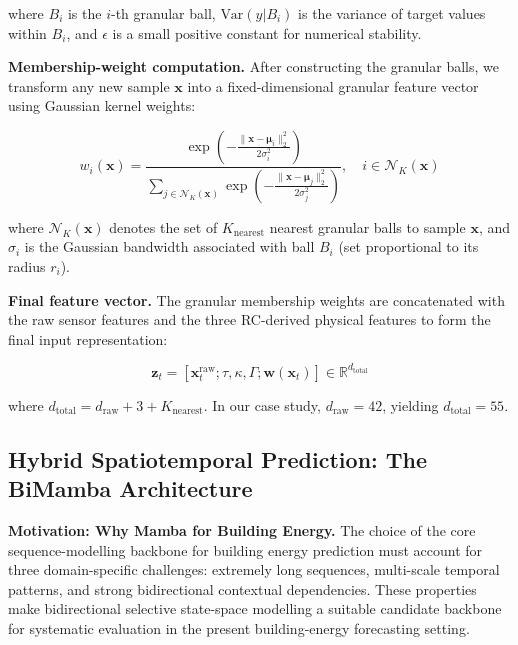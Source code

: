 \documentclass[11pt]{article}
\begin{document}
where $B_i$ is the $i$-th granular ball, $\text{Var}(y|B_i)$ is the variance of target values within $B_i$, and $\epsilon$ is a small positive constant for numerical stability.

\textbf{Membership-weight computation.} After constructing the granular balls, we transform any new sample $\mathbf{x}$ into a fixed-dimensional granular feature vector using Gaussian kernel weights:

\begin{equation}
w_i(\mathbf{x}) = \frac{\exp\left( -\frac{\|\mathbf{x} - \boldsymbol{\mu}_i\|_2^2}{2\sigma_i^2} \right)}{\sum_{j \in \mathcal{N}_K(\mathbf{x})} \exp\left( -\frac{\|\mathbf{x} - \boldsymbol{\mu}_j\|_2^2}{2\sigma_j^2} \right)}, \quad i \in \mathcal{N}_K(\mathbf{x})
\end{equation}

where $\mathcal{N}_K(\mathbf{x})$ denotes the set of $K_{\text{nearest}}$ nearest granular balls to sample $\mathbf{x}$, and $\sigma_i$ is the Gaussian bandwidth associated with ball $B_i$ (set proportional to its radius $r_i$).

\textbf{Final feature vector.} The granular membership weights are concatenated with the raw sensor features and the three RC-derived physical features to form the final input representation:

\begin{equation}
\mathbf{z}_t = [\mathbf{x}_t^{\text{raw}}; \tau, \kappa, \Gamma; \mathbf{w}(\mathbf{x}_t)] \in \mathbb{R}^{d_{\text{total}}}
\end{equation}

where $d_{\text{total}} = d_{\text{raw}} + 3 + K_{\text{nearest}}$. In our case study, $d_{\text{raw}} = 42$, yielding $d_{\text{total}} = 55$.

\subsection{Hybrid Spatiotemporal Prediction: The BiMamba Architecture}

\par\noindent\hspace*{2em}\textbf{Motivation: Why Mamba for Building Energy.} The choice of the core sequence-modelling backbone for building energy prediction must account for three domain-specific challenges: extremely long sequences, multi-scale temporal patterns, and strong bidirectional contextual dependencies. These properties make bidirectional selective state-space modelling a suitable candidate backbone for systematic evaluation in the present building-energy forecasting setting.
\end{document}
